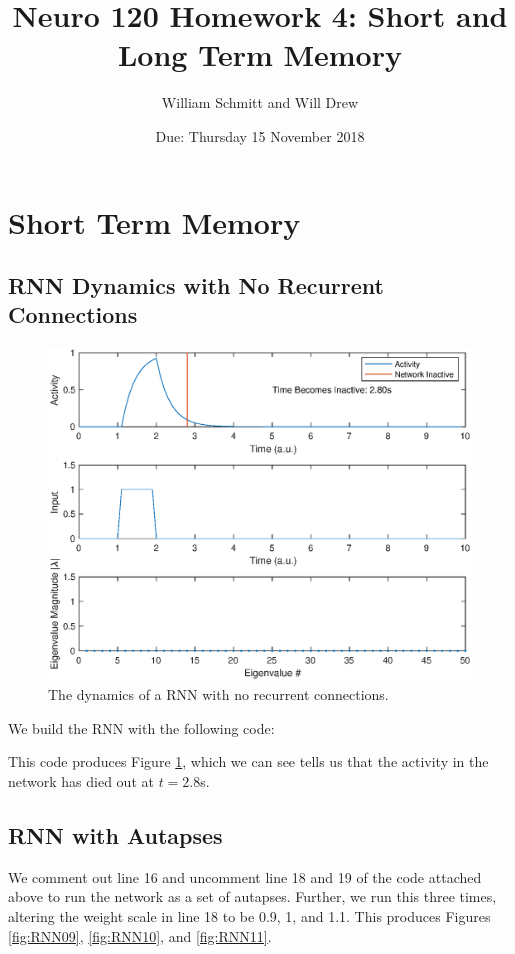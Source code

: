 \documentclass[11pt, oneside]{article}
\title{Neuro 120 Homework 4: Short and Long Term Memory}
\author{William Schmitt and Will Drew}
\date{Due: Thursday 15 November 2018}
\begin{document}
\maketitle

\section{Short Term Memory}

\subsection{RNN Dynamics with No Recurrent Connections}

\begin{figure}[ht!]
\includegraphics[width=1\textwidth]{RNNnoR.eps}
\caption{The dynamics of a RNN with no recurrent connections.}
\label{fig:RNNnoR}
\end{figure}

We build the RNN with the following code:

This code produces Figure \ref{fig:RNNnoR}, which we can see tells us that the activity in the network has died out at $t = 2.8$s.

\subsection{RNN with Autapses}

We comment out line 16 and uncomment line 18 and 19 of the code attached above to run the network as a set of autapses. Further, we run this three times, altering the weight scale in line 18 to be 0.9, 1, and 1.1. This produces Figures \ref{fig:RNN09}, \ref{fig:RNN10}, and \ref{fig:RNN11}.
\end{document}
